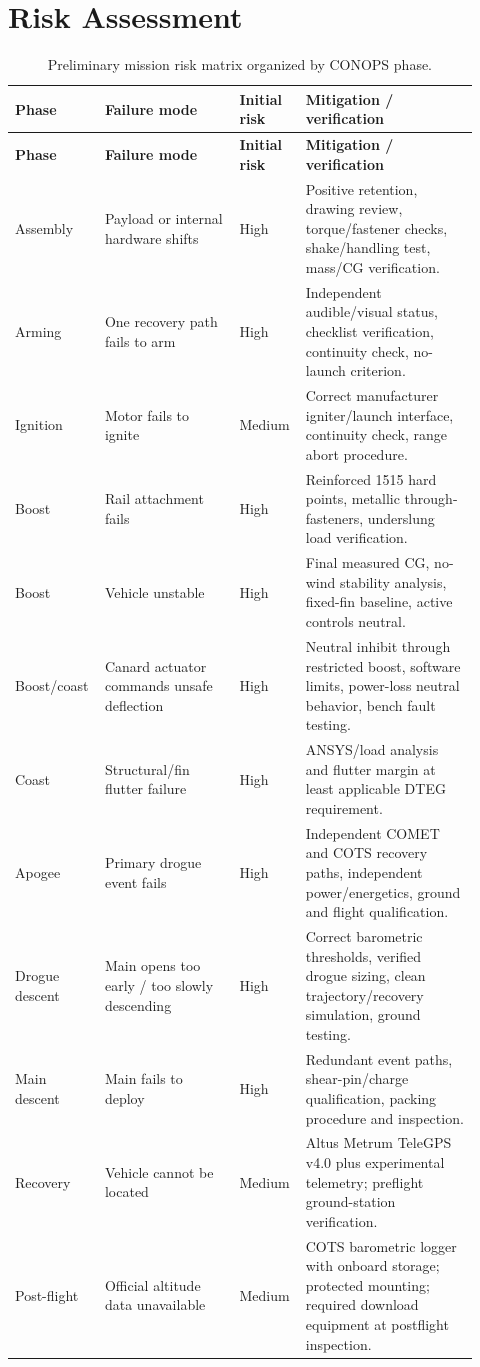 \documentclass[10pt]{article}
\begin{document}
\section{Risk Assessment}
\begin{longtable}{@{}p{0.15\linewidth}p{0.28\linewidth}p{0.13\linewidth}p{0.36\linewidth}@{}}
\caption{Preliminary mission risk matrix organized by CONOPS phase.}\\
\toprule
\textbf{Phase} & \textbf{Failure mode} & \textbf{Initial risk} & \textbf{Mitigation / verification} \\
\midrule
\endfirsthead
\toprule
\textbf{Phase} & \textbf{Failure mode} & \textbf{Initial risk} & \textbf{Mitigation / verification} \\
\midrule
\endhead
Assembly & Payload or internal hardware shifts & High & Positive retention, drawing review, torque/fastener checks, shake/handling test, mass/CG verification. \\
Arming & One recovery path fails to arm & High & Independent audible/visual status, checklist verification, continuity check, no-launch criterion. \\
Ignition & Motor fails to ignite & Medium & Correct manufacturer igniter/launch interface, continuity check, range abort procedure. \\
Boost & Rail attachment fails & High & Reinforced 1515 hard points, metallic through-fasteners, underslung load verification. \\
Boost & Vehicle unstable & High & Final measured CG, no-wind stability analysis, fixed-fin baseline, active controls neutral. \\
Boost/coast & Canard actuator commands unsafe deflection & High & Neutral inhibit through restricted boost, software limits, power-loss neutral behavior, bench fault testing. \\
Coast & Structural/fin flutter failure & High & ANSYS/load analysis and flutter margin at least applicable DTEG requirement. \\
Apogee & Primary drogue event fails & High & Independent COMET and COTS recovery paths, independent power/energetics, ground and flight qualification. \\
Drogue descent & Main opens too early / too slowly descending & High & Correct barometric thresholds, verified drogue sizing, clean trajectory/recovery simulation, ground testing. \\
Main descent & Main fails to deploy & High & Redundant event paths, shear-pin/charge qualification, packing procedure and inspection. \\
Recovery & Vehicle cannot be located & Medium & Altus Metrum TeleGPS v4.0 plus experimental telemetry; preflight ground-station verification. \\
Post-flight & Official altitude data unavailable & Medium & COTS barometric logger with onboard storage; protected mounting; required download equipment at postflight inspection. \\
\bottomrule
\end{longtable}
\end{document}
